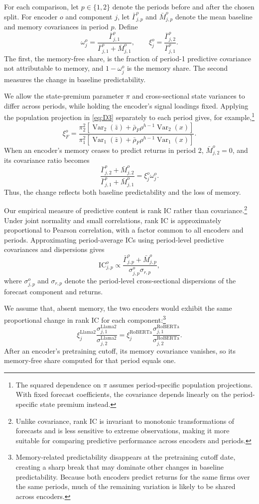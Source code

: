 \documentclass[11pt,letterpaper]{article}
\theoremstyle{remark}
\DeclareMathOperator{\Var}{Var}
\begin{document}
For each comparison, let $p\in\{1,2\}$ denote the periods before and after the chosen split. For encoder $o$ and component $j$, let $\bar\Gamma_{j,p}^o$ and $\bar M_{j,p}^o$ denote the mean baseline and memory covariances in period $p$. Define
\[
\omega_j^o
=\frac{\bar\Gamma_{j,1}^o}
{\bar\Gamma_{j,1}^o+\bar M_{j,1}^o},
\qquad
\xi_j^o
=\frac{\bar\Gamma_{j,2}^o}{\bar\Gamma_{j,1}^o}.
\]
The first, the memory-free share, is the fraction of period-1 predictive covariance not attributable to memory, and $1-\omega_j^o$ is the memory share. The second measures the change in baseline predictability.

We allow the state-premium parameter $\pi$ and cross-sectional state variances to differ across periods, while holding the encoder's signal loadings fixed. Applying the population projection in \eqref{eq:D3} separately to each period gives, for example,\footnote{The squared dependence on $\pi$ assumes period-specific population projections. With fixed forecast coefficients, the covariance depends linearly on the period-specific state premium instead.}
\[
\xi_F^o
=\frac{\pi_2^2\left[\Var_2(\bar z)+\bar\rho_F\rho^{h-1}\Var_2(x)\right]}
{\pi_1^2\left[\Var_1(\bar z)+\bar\rho_F\rho^{h-1}\Var_1(x)\right]}.
\]
When an encoder's memory ceases to predict returns in period 2, $\bar M_{j,2}^o=0$, and its covariance ratio becomes
\begin{equation}\label{eq:D27}
\frac{\bar\Gamma_{j,2}^o+\bar M_{j,2}^o}
{\bar\Gamma_{j,1}^o+\bar M_{j,1}^o}
=\xi_j^o\omega_j^o.
\end{equation}
Thus, the change reflects both baseline predictability and the loss of memory.

Our empirical measure of predictive content is rank IC rather than covariance.\footnote{Unlike covariance, rank IC is invariant to monotonic transformations of forecasts and is less sensitive to extreme observations, making it more suitable for comparing predictive performance across encoders and periods.}
Under joint normality and small correlations, rank IC is approximately proportional to Pearson correlation, with a factor common to all encoders and periods. Approximating period-average ICs using period-level predictive covariances and dispersions gives
\[
\mathrm{IC}_{j,p}^o
\propto
\frac{\bar\Gamma_{j,p}^o+\bar M_{j,p}^o}
{\sigma_{j,p}^o\sigma_{r,p}},
\]
where $\sigma_{j,p}^o$ and $\sigma_{r,p}$ denote the period-level cross-sectional dispersions of the forecast component and returns.

We assume that, absent memory, the two encoders would exhibit the same proportional change in rank IC for each component:\footnote{Memory-related predictability disappears at the pretraining cutoff date, creating a sharp break that may dominate other changes in baseline predictability. Because both encoders predict returns for the same firms over the same periods, much of the remaining variation is likely to be shared across encoders.}
\[
\xi_j^{\mathrm{Llama2}}
\frac{\sigma_{j,1}^{\mathrm{Llama2}}}{\sigma_{j,2}^{\mathrm{Llama2}}}
=
\xi_j^{\mathrm{RoBERTa}}
\frac{\sigma_{j,1}^{\mathrm{RoBERTa}}}{\sigma_{j,2}^{\mathrm{RoBERTa}}}.
\]
After an encoder's pretraining cutoff, its memory covariance vanishes, so its memory-free share computed for that period equals one.
\end{document}
